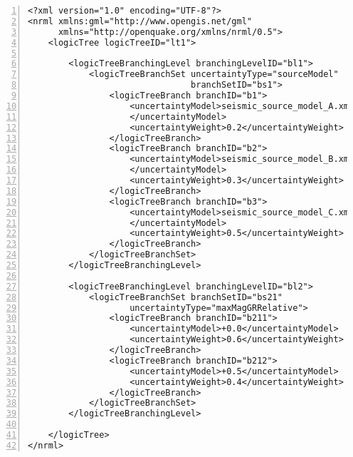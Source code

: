 \begin{Verbatim}[frame=single, commandchars=\\\{\}, fontsize=\small,
    firstnumber=1, numbers=left, numbersep=2pt]
<?xml version="1.0" encoding="UTF-8"?>
<nrml xmlns:gml="http://www.opengis.net/gml"
      xmlns="http://openquake.org/xmlns/nrml/0.5">
    <logicTree logicTreeID="lt1">

        <logicTreeBranchingLevel branchingLevelID="bl1">
            <logicTreeBranchSet uncertaintyType="sourceModel"
                                branchSetID="bs1">
                <logicTreeBranch branchID="b1">
                    <uncertaintyModel>seismic_source_model_A.xml
                    </uncertaintyModel>
                    <uncertaintyWeight>0.2</uncertaintyWeight>
                </logicTreeBranch>
                <logicTreeBranch branchID="b2">
                    <uncertaintyModel>seismic_source_model_B.xml
                    </uncertaintyModel>
                    <uncertaintyWeight>0.3</uncertaintyWeight>
                </logicTreeBranch>
                <logicTreeBranch branchID="b3">
                    <uncertaintyModel>seismic_source_model_C.xml
                    </uncertaintyModel>
                    <uncertaintyWeight>0.5</uncertaintyWeight>
                </logicTreeBranch>
            </logicTreeBranchSet>
        </logicTreeBranchingLevel>

        <logicTreeBranchingLevel branchingLevelID="bl2">
            <logicTreeBranchSet branchSetID="bs21" 
                    uncertaintyType="maxMagGRRelative">
                <logicTreeBranch branchID="b211">
                    <uncertaintyModel>+0.0</uncertaintyModel>
                    <uncertaintyWeight>0.6</uncertaintyWeight>
                </logicTreeBranch>
                <logicTreeBranch branchID="b212">
                    <uncertaintyModel>+0.5</uncertaintyModel>
                    <uncertaintyWeight>0.4</uncertaintyWeight>
                </logicTreeBranch>
            </logicTreeBranchSet>
        </logicTreeBranchingLevel>

    </logicTree>
</nrml>
\end{Verbatim}